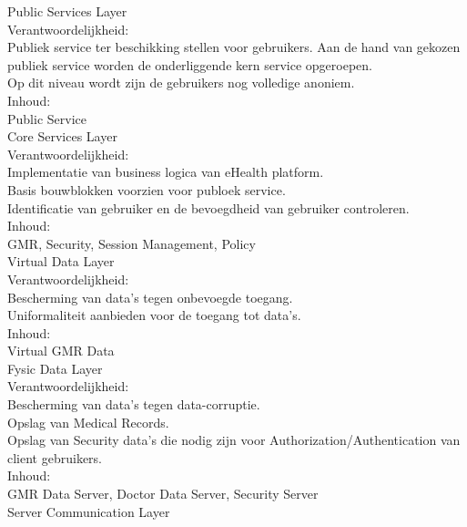 \documentclass[a4paper,10pt]{article}
\begin{document}
Public Services Layer\\

Verantwoordelijkheid:\\
Publiek service ter beschikking stellen voor gebruikers. Aan de hand van gekozen publiek service worden de onderliggende kern service opgeroepen.\\
Op dit niveau wordt zijn de gebruikers nog volledige anoniem.\\

Inhoud:\\
Public Service\\

Core Services Layer\\

Verantwoordelijkheid:\\
Implementatie van business logica van eHealth platform.\\
Basis bouwblokken voorzien voor publoek service.\\
Identificatie van gebruiker en de bevoegdheid van gebruiker controleren.\\

Inhoud:\\
GMR, Security, Session Management, Policy\\

Virtual Data Layer\\

Verantwoordelijkheid:\\
Bescherming van data's tegen onbevoegde toegang.\\
Uniformaliteit aanbieden voor de toegang tot data's.\\

Inhoud:\\
Virtual GMR Data\\

Fysic Data Layer\\

Verantwoordelijkheid:\\
Bescherming van data's tegen data-corruptie.\\
Opslag van Medical Records.\\
Opslag van Security data's die nodig zijn voor Authorization/Authentication van client gebruikers.\\

Inhoud:\\
GMR Data Server, Doctor Data Server, Security Server\\


Server Communication Layer\\
\end{document}
